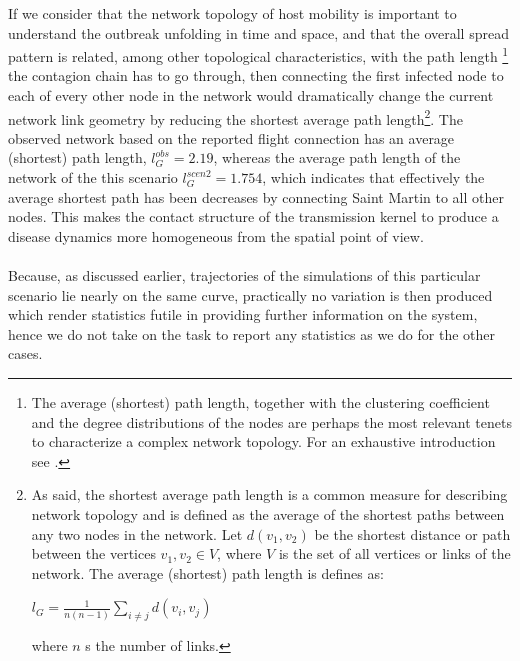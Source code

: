 \documentclass[10pt,a4paper]{article}
\begin{document}
If we consider that the network topology of host mobility is important to understand the outbreak unfolding in time and space, and that the overall spread pattern is related, among other topological characteristics, with the path length \footnote{The average (shortest) path length, together with the clustering coefficient and the degree distributions of the nodes are perhaps the most relevant tenets to characterize a complex network topology. For an exhaustive introduction see \citep{mej2010networks}.} the contagion chain has to go through, then connecting the first infected node to each of every other node in the network would dramatically change the current network link geometry by reducing the shortest average path length\footnote{As said, the shortest average path length is a common measure for describing network topology and is defined as the average of the shortest paths between any two nodes in the network. Let $d(v_1,v_2)$ be the shortest distance or path between the vertices $v_1, v_2 \in V$, where $V$ is the set of all vertices or links of the network. The average (shortest) path length is defines as:

$l_G = \frac{1}{n(n-1)}\sum_{i\neq j}d(v_i,v_j)$

where $n$ s the number of links\citep{wiki:general}.}. The observed network based on the reported flight connection has an average (shortest) path length, $l_G^{obs} = 2.19$, whereas the average path length of the network of the this scenario $l_G^{scen2} = 1.754 $, which indicates that effectively the average shortest path has been decreases by connecting Saint Martin to all other nodes. This makes the contact structure of the transmission kernel to produce a disease dynamics more homogeneous from the spatial point of view. 
\\\\
Because, as discussed earlier, trajectories of the simulations of this particular scenario lie nearly on the same curve, practically no variation is then produced which render statistics futile in providing further information on the system, hence we do not take on the task to report any statistics as we do for the other cases. 
\end{document}

